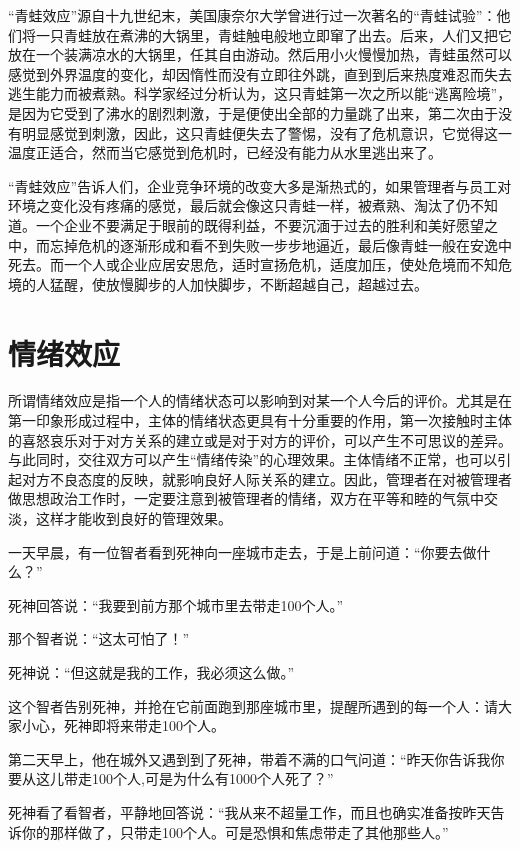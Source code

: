\documentclass[11pt]{ctexart}
\begin{document}
“青蛙效应”源自十九世纪末，美国康奈尔大学曾进行过一次著名的“青蛙试验”：他们将一只青蛙放在煮沸的大锅里，青蛙触电般地立即窜了出去。后来，人们又把它放在一个装满凉水的大锅里，任其自由游动。然后用小火慢慢加热，青蛙虽然可以感觉到外界温度的变化，却因惰性而没有立即往外跳，直到到后来热度难忍而失去逃生能力而被煮熟。科学家经过分析认为，这只青蛙第一次之所以能“逃离险境”，是因为它受到了沸水的剧烈刺激，于是便使出全部的力量跳了出来，第二次由于没有明显感觉到刺激，因此，这只青蛙便失去了警惕，没有了危机意识，它觉得这一温度正适合，然而当它感觉到危机时，已经没有能力从水里逃出来了。

“青蛙效应”告诉人们，企业竞争环境的改变大多是渐热式的，如果管理者与员工对环境之变化没有疼痛的感觉，最后就会像这只青蛙一样，被煮熟、淘汰了仍不知道。一个企业不要满足于眼前的既得利益，不要沉湎于过去的胜利和美好愿望之中，而忘掉危机的逐渐形成和看不到失败一步步地逼近，最后像青蛙一般在安逸中死去。而一个人或企业应居安思危，适时宣扬危机，适度加压，使处危境而不知危境的人猛醒，使放慢脚步的人加快脚步，不断超越自己，超越过去。
\section{情绪效应}
\label{sec-83}


所谓情绪效应是指一个人的情绪状态可以影响到对某一个人今后的评价。尤其是在第一印象形成过程中，主体的情绪状态更具有十分重要的作用，第一次接触时主体的喜怒哀乐对于对方关系的建立或是对于对方的评价，可以产生不可思议的差异。与此同时，交往双方可以产生“情绪传染”的心理效果。主体情绪不正常，也可以引起对方不良态度的反映，就影响良好人际关系的建立。因此，管理者在对被管理者做思想政治工作时，一定要注意到被管理者的情绪，双方在平等和睦的气氛中交淡，这样才能收到良好的管理效果。

一天早晨，有一位智者看到死神向一座城市走去，于是上前问道：“你要去做什么？”

死神回答说：“我要到前方那个城市里去带走100个人。”

那个智者说：“这太可怕了！”

死神说：“但这就是我的工作，我必须这么做。”

这个智者告别死神，并抢在它前面跑到那座城市里，提醒所遇到的每一个人：请大家小心，死神即将来带走100个人。

第二天早上，他在城外又遇到到了死神，带着不满的口气问道：“昨天你告诉我你要从这儿带走100个人,可是为什么有1000个人死了？”

死神看了看智者，平静地回答说：“我从来不超量工作，而且也确实准备按昨天告诉你的那样做了，只带走100个人。可是恐惧和焦虑带走了其他那些人。”
\end{document}
